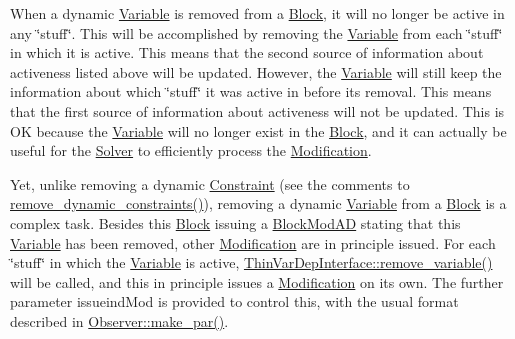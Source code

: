 When a dynamic \mbox{\hyperlink{class_s_m_spp__di__unipi__it_1_1_variable}{Variable}} is removed from a \mbox{\hyperlink{class_s_m_spp__di__unipi__it_1_1_block}{Block}}, it will no longer be active in any \char`\"{}stuff\char`\"{}. This will be accomplished by removing the \mbox{\hyperlink{class_s_m_spp__di__unipi__it_1_1_variable}{Variable}} from each \char`\"{}stuff\char`\"{} in which it is active. This means that the second source of information about activeness listed above will be updated. However, the \mbox{\hyperlink{class_s_m_spp__di__unipi__it_1_1_variable}{Variable}} will still keep the information about which \char`\"{}stuff\char`\"{} it was active in before its removal. This means that the first source of information about activeness will not be updated. This is OK because the \mbox{\hyperlink{class_s_m_spp__di__unipi__it_1_1_variable}{Variable}} will no longer exist in the \mbox{\hyperlink{class_s_m_spp__di__unipi__it_1_1_block}{Block}}, and it can actually be useful for the \mbox{\hyperlink{class_s_m_spp__di__unipi__it_1_1_solver}{Solver}} to efficiently process the \mbox{\hyperlink{class_s_m_spp__di__unipi__it_1_1_modification}{Modification}}.

Yet, unlike removing a dynamic \mbox{\hyperlink{class_s_m_spp__di__unipi__it_1_1_constraint}{Constraint}} (see the comments to \mbox{\hyperlink{class_s_m_spp__di__unipi__it_1_1_block_a70a454edfce317205e2b0e65823a8322}{remove\+\_\+dynamic\+\_\+constraints()}}), removing a dynamic \mbox{\hyperlink{class_s_m_spp__di__unipi__it_1_1_variable}{Variable}} from a \mbox{\hyperlink{class_s_m_spp__di__unipi__it_1_1_block}{Block}} is a complex task. Besides this \mbox{\hyperlink{class_s_m_spp__di__unipi__it_1_1_block}{Block}} issuing a \mbox{\hyperlink{class_s_m_spp__di__unipi__it_1_1_block_mod_a_d}{Block\+Mod\+AD}} stating that this \mbox{\hyperlink{class_s_m_spp__di__unipi__it_1_1_variable}{Variable}} has been removed, other \mbox{\hyperlink{class_s_m_spp__di__unipi__it_1_1_modification}{Modification}} are in principle issued. For each \char`\"{}stuff\char`\"{} in which the \mbox{\hyperlink{class_s_m_spp__di__unipi__it_1_1_variable}{Variable}} is active, \mbox{\hyperlink{group___thin_var_dep_interface___c_l_a_s_s_e_s_gad6726141a0cbe6a0410a2b396809dade}{Thin\+Var\+Dep\+Interface\+::remove\+\_\+variable()}} will be called, and this in principle issues a \mbox{\hyperlink{class_s_m_spp__di__unipi__it_1_1_modification}{Modification}} on its own. The further parameter issueind\+Mod is provided to control this, with the usual format described in \mbox{\hyperlink{class_s_m_spp__di__unipi__it_1_1_observer_a2d499ae38e5e95cf66cd71da32b0694a}{Observer\+::make\+\_\+par()}}.

